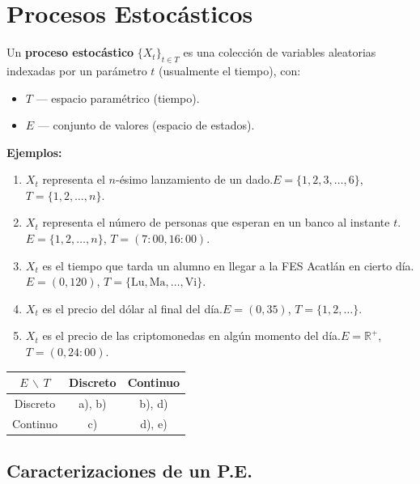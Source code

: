 \section{Procesos Estocásticos}

\begin{defi}{}{}
Un \textbf{proceso estocástico} $\{X_t\}_{t \in T}$ es una colección de variables aleatorias indexadas por un parámetro $t$ (usualmente el tiempo), con:
\begin{itemize}
    \item $T$ --- espacio paramétrico (tiempo).
    \item $E$ --- conjunto de valores (espacio de estados).
\end{itemize}
\end{defi}

\textbf{Ejemplos:}
\begin{enumerate}[label=\alph*)]
    \item $X_t$ representa el $n$-ésimo lanzamiento de un dado.\quad $E=\{1,2,3,\dots,6\}$, $T=\{1,2,\dots,n\}$.
    \item $X_t$ representa el número de personas que esperan en un banco al instante $t$.\quad $E=\{1,2,\dots,n\}$, $T=(7{:}00,16{:}00)$.
    \item $X_t$ es el tiempo que tarda un alumno en llegar a la FES Acatlán en cierto día.\quad $E=(0,120)$, $T=\{\text{Lu},\text{Ma},\dots,\text{Vi}\}$.
    \item $X_t$ es el precio del dólar al final del día.\quad $E=(0,35)$, $T=\{1,2,\dots\}$.
    \item $X_t$ es el precio de las criptomonedas en algún momento del día.\quad $E=\mathbb{R}^+$, $T=(0,24{:}00)$.
\end{enumerate}

\begin{center}
\begin{tabular}{c|cc}
    $E \,\backslash\, T$ & Discreto & Continuo \\\hline
    Discreto & a), b) & b), d) \\
    Continuo & c)     & d), e) \\
\end{tabular}
\end{center}

\subsection{Caracterizaciones de un P.E.}

